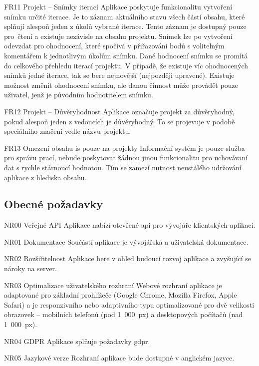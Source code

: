 \begin{dl}
   \item[FR11 Projekt -- Snímky iterací]
   Aplikace poskytuje funkcionalitu vytvoření snímku určité iterace. Je to záznam aktuálního stavu všech částí obsahu, které splňují alespoň jeden z úkolů vybrané iterace. Tento záznam je dostupný pouze pro~čtení a existuje nezávisle na obsahu projektu. Snímek lze po vytvoření odevzdat pro ohodnocení, které spočívá v přiřazování bodů s volitelným komentářem k jednotlivým úkolům snímku. Dané hodnocení snímku se promítá do celkového přehledu iterací projektu. V případě, že existuje víc ohodnocených snímků jedné iterace, tak se bere nejnovější (nejpozději upravené). Existuje možnost změnit ohodnocení snímku, ale danou činnost může provádět pouze uživatel, jenž je původním hodnotitelem snímku.

   \item[FR12 Projekt -- Důvěryhodnost]
   Aplikace označuje projekt za důvěryhodný, pokud alespoň jeden z vedoucích je důvěryhodný. To se projevuje v podobě speciálního značení vedle názvu projektu.

   \item[FR13 Omezení obsahu \gls{is} pouze na projekty]
   Informační systém je pouze služba pro správu prací, nebude poskytovat žádnou jinou funkcionalitu pro uchovávaní dat s rychle stárnoucí hodnotou. Tím se zamezí nutnost neustálého udržování aplikace z hlediska obsahu.

\end{dl}


\subsection{Obecné požadavky}

\begin{dl}
   \item[NR00 Veřejné API]
   Aplikace nabízí otevřené \gls{api} pro vývojáře klientských aplikací.

   \item[NR01 Dokumentace]
   Součástí aplikace je vývojářská a uživatelská dokumentace.

   \item[NR02 Rozšiřitelnost]
   Aplikace bere v ohled budoucí rozvoj aplikace a zvyšující se nároky na server.

   \item[NR03 Optimalizace uživatelského rozhraní]
   Webové rozhraní aplikace je adaptované pro základní prohlížeče (Google Chrome, Mozilla Firefox, Apple Safari) a je responzivního nebo adaptivního typu optimalizované pro dvě velikosti obrazovek -- mobilních telefonů (pod 1~000~px) a desktopových počítačů (nad 1~000~px).

   \newpage
   \item[NR04 GDPR] 
   Aplikace splňuje požadavky \gls{gdpr}.

   \item[NR05 Jazykové verze] 
   Rozhraní aplikace bude dostupné v anglickém jazyce.
\end{dl}
